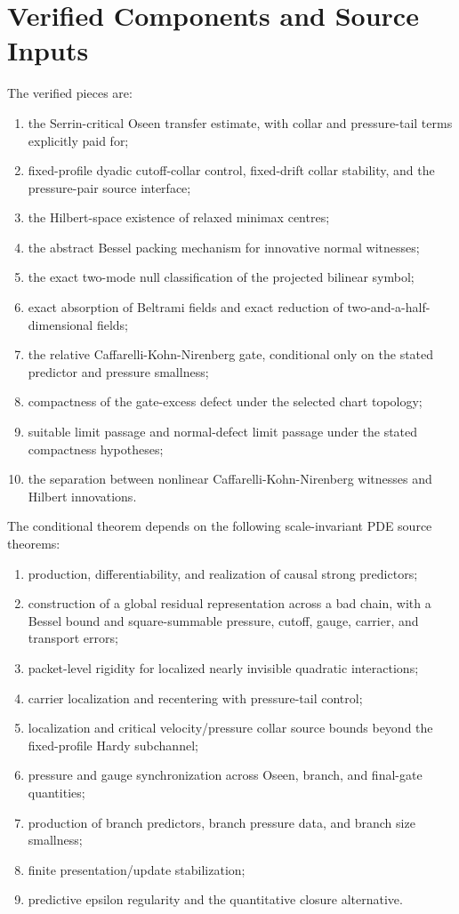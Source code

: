 \documentclass[11pt]{article}
\begin{document}
\section{Verified Components and Source Inputs}

The verified pieces are:
\begin{enumerate}[label=(\roman*)]
\item the Serrin-critical Oseen transfer estimate, with collar and pressure-tail terms explicitly paid for;
\item fixed-profile dyadic cutoff-collar control, fixed-drift collar stability,
and the pressure-pair source interface;
\item the Hilbert-space existence of relaxed minimax centres;
\item the abstract Bessel packing mechanism for innovative normal witnesses;
\item the exact two-mode null classification of the projected bilinear symbol;
\item exact absorption of Beltrami fields and exact reduction of two-and-a-half-dimensional fields;
\item the relative Caffarelli-Kohn-Nirenberg gate, conditional only on the stated predictor and pressure smallness;
\item compactness of the gate-excess defect under the selected chart topology;
\item suitable limit passage and normal-defect limit passage under the stated compactness hypotheses;
\item the separation between nonlinear Caffarelli-Kohn-Nirenberg witnesses and Hilbert innovations.
\end{enumerate}

The conditional theorem depends on the following scale-invariant PDE source
theorems:
\begin{enumerate}[label=(\roman*)]
\item production, differentiability, and realization of causal strong predictors;
\item construction of a global residual representation across a bad chain, with
a Bessel bound and square-summable pressure, cutoff, gauge, carrier, and
transport errors;
\item packet-level rigidity for localized nearly invisible quadratic
interactions;
\item carrier localization and recentering with pressure-tail control;
\item localization and critical velocity/pressure collar source bounds beyond
the fixed-profile Hardy subchannel;
\item pressure and gauge synchronization across Oseen, branch, and final-gate
quantities;
\item production of branch predictors, branch pressure data, and branch size
smallness;
\item finite presentation/update stabilization;
\item predictive epsilon regularity and the quantitative closure alternative.
\end{enumerate}
\end{document}
